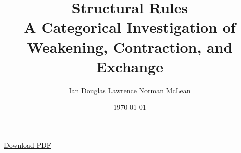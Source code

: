 \documentclass[12pt]{report}
\title{Structural Rules\\[0.5em]
\large A Categorical Investigation of Weakening, Contraction, and Exchange}
\author{Ian Douglas Lawrence Norman McLean}
\date{\today}
\begin{document}
\hypersetup{pageanchor=false}
\maketitle
\hypersetup{pageanchor=true}

\begin{center}
\href{main.pdf}{Download PDF}
\end{center}

\tableofcontents






\end{document}
